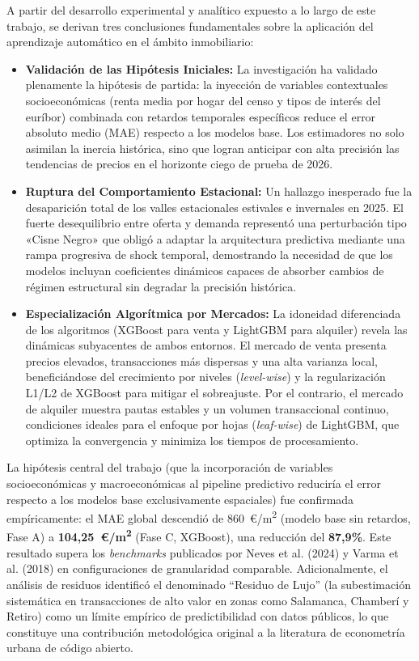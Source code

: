 \documentclass[a4paper,11pt,openany]{book}
\begin{document}
A partir del desarrollo experimental y analítico expuesto a lo largo de este trabajo, se derivan tres conclusiones fundamentales sobre la aplicación del aprendizaje automático en el ámbito inmobiliario:
\begin{itemize}
    \item \textbf{Validación de las Hipótesis Iniciales:} La investigación ha validado plenamente la hipótesis de partida: la inyección de variables contextuales socioeconómicas (renta media por hogar del censo y tipos de interés del euríbor) combinada con retardos temporales específicos reduce el error absoluto medio (MAE) respecto a los modelos base. Los estimadores no solo asimilan la inercia histórica, sino que logran anticipar con alta precisión las tendencias de precios en el horizonte ciego de prueba de 2026.
    \item \textbf{Ruptura del Comportamiento Estacional:} Un hallazgo inesperado fue la desaparición total de los valles estacionales estivales e invernales en 2025. El fuerte desequilibrio entre oferta y demanda representó una perturbación tipo «Cisne Negro» que obligó a adaptar la arquitectura predictiva mediante una rampa progresiva de shock temporal, demostrando la necesidad de que los modelos incluyan coeficientes dinámicos capaces de absorber cambios de régimen estructural sin degradar la precisión histórica.
    \item \textbf{Especialización Algorítmica por Mercados:} La idoneidad diferenciada de los algoritmos (XGBoost para venta y LightGBM para alquiler) revela las dinámicas subyacentes de ambos entornos. El mercado de venta presenta precios elevados, transacciones más dispersas y una alta varianza local, beneficiándose del crecimiento por niveles (\textit{level-wise}) y la regularización L1/L2 de XGBoost para mitigar el sobreajuste. Por el contrario, el mercado de alquiler muestra pautas estables y un volumen transaccional continuo, condiciones ideales para el enfoque por hojas (\textit{leaf-wise}) de LightGBM, que optimiza la convergencia y minimiza los tiempos de procesamiento.
\end{itemize}

\noindent La hipótesis central del trabajo (que la incorporación de variables socioeconómicas y macroeconómicas al pipeline predictivo reduciría el error respecto a los modelos base exclusivamente espaciales) fue confirmada empíricamente: el MAE global descendió de 860~€/m\textsuperscript{2} (modelo base sin retardos, Fase A) a \textbf{104,25~€/m\textsuperscript{2}} (Fase C, XGBoost), una reducción del \textbf{87,9\%}. Este resultado supera los \textit{benchmarks} publicados por Neves et al. (2024) y Varma et al. (2018) en configuraciones de granularidad comparable. Adicionalmente, el análisis de residuos identificó el denominado ``Residuo de Lujo'' (la subestimación sistemática en transacciones de alto valor en zonas como Salamanca, Chamberí y Retiro) como un límite empírico de predictibilidad con datos públicos, lo que constituye una contribución metodológica original a la literatura de econometría urbana de código abierto.
\end{document}
